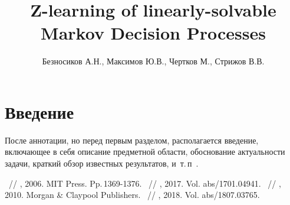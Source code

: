 \documentclass[12pt,twoside]{article}
\title
    [Z-learning of linearly-solvable Markov Decision Processes] %
    {Z-learning of linearly-solvable Markov Decision Processes}
\author
    [Безносиков А.Н.] %
    {Безносиков А.Н., Максимов Ю.В., Чертков М., Стрижов В.В.} %
    [Aleksandr Beznosikov$^1$, Yury Maximov, Michael Chertkov, Vadim Strijov]
\begin{document}
\maketitle

\section{Введение}
После аннотации, но перед первым разделом,
располагается введение, включающее в себя
описание предметной области,
обоснование актуальности задачи,
краткий обзор известных результатов,
и~т.\,п~\cite{1,myHandbook,author09first-word-of-the-title,voron06latex,author-and-co2007,Lvovsky03}.




\begin{thebibliography}{1}

    ~//
    , 2006. MIT Press. Pp.\,1369-1376.
    ~//
    , 2017. Vol. abs/1701.04941.
    ~//
    , 2010. Morgan \& Claypool Publishers.
    ~//
    , 2018. Vol. abs/1807.03765.
\end{thebibliography}
\end{document}
